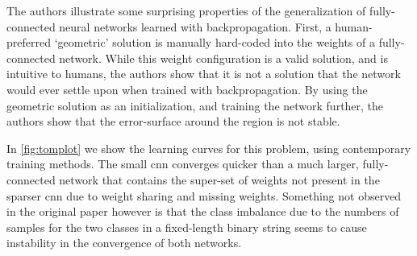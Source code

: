 \documentclass[thesis]{subfiles}
\begin{document}
	The authors illustrate some surprising properties of the generalization of fully-connected neural networks learned with backpropagation. First, a human-preferred `geometric' solution is manually hard-coded into the weights of a fully-connected network. While this weight configuration is a valid solution, and is intuitive to humans, the authors show that it is not a solution that the network would ever settle upon when trained with backpropagation. By using the geometric solution as an initialization, and training the network further, the authors show that the error-surface around the region is not stable.

	In \cref{fig:tomplot} we show the learning curves for this problem, using contemporary training methods. The small \gls{cnn} converges quicker than a much larger, fully-connected network that contains the super-set of weights not present in the sparser \gls{cnn} due to weight sharing and missing weights. Something not observed in the original paper however is that the class imbalance due to the numbers of samples for the two classes in a fixed-length binary string seems to cause instability in the convergence of both networks.
\end{document}
